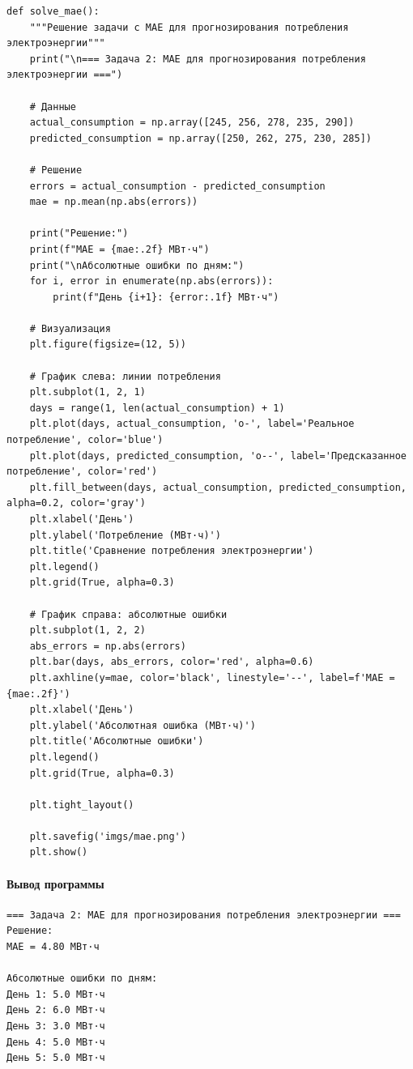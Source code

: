\begin{verbatim}
def solve_mae():
    """Решение задачи с MAE для прогнозирования потребления электроэнергии"""
    print("\n=== Задача 2: MAE для прогнозирования потребления электроэнергии ===")
    
    # Данные
    actual_consumption = np.array([245, 256, 278, 235, 290])
    predicted_consumption = np.array([250, 262, 275, 230, 285])
    
    # Решение
    errors = actual_consumption - predicted_consumption
    mae = np.mean(np.abs(errors))
    
    print("Решение:")
    print(f"MAE = {mae:.2f} МВт·ч")
    print("\nАбсолютные ошибки по дням:")
    for i, error in enumerate(np.abs(errors)):
        print(f"День {i+1}: {error:.1f} МВт·ч")
    
    # Визуализация
    plt.figure(figsize=(12, 5))
    
    # График слева: линии потребления
    plt.subplot(1, 2, 1)
    days = range(1, len(actual_consumption) + 1)
    plt.plot(days, actual_consumption, 'o-', label='Реальное потребление', color='blue')
    plt.plot(days, predicted_consumption, 'o--', label='Предсказанное потребление', color='red')
    plt.fill_between(days, actual_consumption, predicted_consumption, alpha=0.2, color='gray')
    plt.xlabel('День')
    plt.ylabel('Потребление (МВт·ч)')
    plt.title('Сравнение потребления электроэнергии')
    plt.legend()
    plt.grid(True, alpha=0.3)
    
    # График справа: абсолютные ошибки
    plt.subplot(1, 2, 2)
    abs_errors = np.abs(errors)
    plt.bar(days, abs_errors, color='red', alpha=0.6)
    plt.axhline(y=mae, color='black', linestyle='--', label=f'MAE = {mae:.2f}')
    plt.xlabel('День')
    plt.ylabel('Абсолютная ошибка (МВт·ч)')
    plt.title('Абсолютные ошибки')
    plt.legend()
    plt.grid(True, alpha=0.3)
    
    plt.tight_layout()
    
    plt.savefig('imgs/mae.png')
    plt.show()
\end{verbatim}
\paragraph{Вывод программы}
\begin{verbatim}
=== Задача 2: MAE для прогнозирования потребления электроэнергии ===
Решение:
MAE = 4.80 МВт·ч

Абсолютные ошибки по дням:
День 1: 5.0 МВт·ч
День 2: 6.0 МВт·ч
День 3: 3.0 МВт·ч
День 4: 5.0 МВт·ч
День 5: 5.0 МВт·ч
\end{verbatim}

